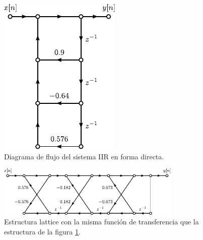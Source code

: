 \documentclass[a4paper]{report}
\begin{document}
\begin{figure}[!htb]
  \begin{minipage}[c]{0.31\textwidth}
    \includegraphics[width=\textwidth]{figuras/structures_lattice_example_06_10_IIR_direct.pdf}
  \end{minipage}\hfill
  \begin{minipage}[c]{0.59\textwidth}
    \caption{
     Diagrama de flujo del sistema IIR en forma directa.
    }\label{fig:structures_lattice_example_06_10_IIR_direct}
  \end{minipage}
\end{figure}
\begin{figure}[!htb]
 \begin{center}
 \includegraphics[width=0.78\textwidth]{figuras/structures_lattice_example_06_10_lattice.pdf}
 \caption{\label{fig:structures_lattice_example_06_10_lattice} Estructura lattice con la misma función de transferencia que la estructura de la figura \ref{fig:structures_lattice_example_06_10_IIR_direct}.}
 \end{center}
\end{figure}
\end{document}
